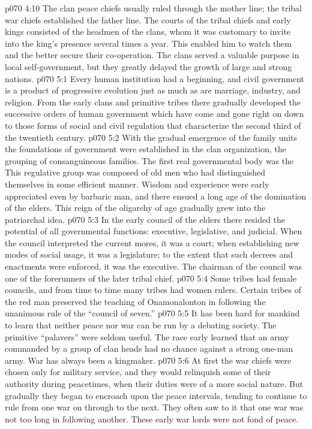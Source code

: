 \vs p070 4:10 The clan peace chiefs usually ruled through the mother line; the tribal war chiefs established the father line. The courts of the tribal chiefs and early kings consisted of the headmen of the clans, whom it was customary to invite into the king’s presence several times a year. This enabled him to watch them and the better secure their co\hyp{}operation. The clans served a valuable purpose in local self\hyp{}government, but they greatly delayed the growth of large and strong nations.
\vs p070 5:1 Every human institution had a beginning, and civil government is a product of progressive evolution just as much as are marriage, industry, and religion. From the early clans and primitive tribes there gradually developed the successive orders of human government which have come and gone right on down to those forms of social and civil regulation that characterize the second third of the twentieth century.
\vs p070 5:2 With the gradual emergence of the family units the foundations of government were established in the clan organization, the grouping of consanguineous families. The first real governmental body was the  This regulative group was composed of old men who had distinguished themselves in some efficient manner. Wisdom and experience were early appreciated even by barbaric man, and there ensued a long age of the domination of the elders. This reign of the oligarchy of age gradually grew into the patriarchal idea.\plusone
\vs p070 5:3 In the early council of the elders there resided the potential of all governmental functions: executive, legislative, and judicial. When the council interpreted the current mores, it was a court; when establishing new modes of social usage, it was a legislature; to the extent that such decrees and enactments were enforced, it was the executive. The chairman of the council was one of the forerunners of the later tribal chief.
\vs p070 5:4 Some tribes had female councils, and from time to time many tribes had women rulers. Certain tribes of the red man preserved the teaching of Onamonalonton in following the unanimous rule of the “council of seven.”
\pc \vs p070 5:5 It has been hard for mankind to learn that neither peace nor war can be run by a debating society. The primitive “palavers” were seldom useful. The race early learned that an army commanded by a group of clan heads had no chance against a strong one\hyp{}man army. War has always been a kingmaker.
\pc \vs p070 5:6 At first the war chiefs were chosen only for military service, and they would relinquish some of their authority during peacetimes, when their duties were of a more social nature. But gradually they began to encroach upon the peace intervals, tending to continue to rule from one war on through to the next. They often saw to it that one war was not too long in following another. These early war lords were not fond of peace.
